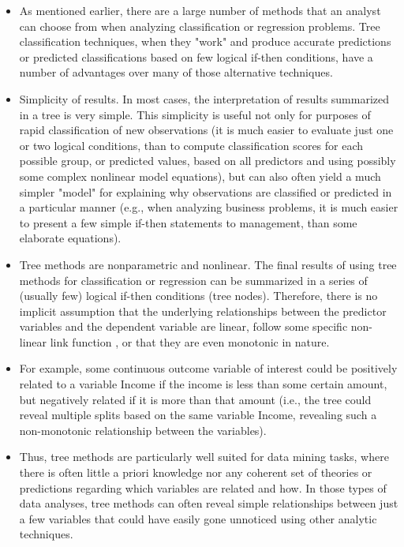 \documentclass[caret-main.tex]{subfiles}
\begin{document}
\begin{itemize}
\item As mentioned earlier, there are a large number of methods that an analyst can choose from when analyzing classification or regression problems. Tree classification techniques, when they "work" and produce accurate predictions or predicted classifications based on few logical if-then conditions, have a number of advantages over many of those alternative techniques.

\item Simplicity of results. In most cases, the interpretation of results summarized in a tree is very simple. This simplicity is useful not only for purposes of rapid classification of new observations (it is much easier to evaluate just one or two logical conditions, than to compute classification scores for each possible group, or predicted values, based on all predictors and using possibly some complex nonlinear model equations), but can also often yield a much simpler "model" for explaining why observations are classified or predicted in a particular manner (e.g., when analyzing business problems, it is much easier to present a few simple if-then statements to management, than some elaborate equations).

\item Tree methods are nonparametric and nonlinear. The final results of using tree methods for classification or regression can be summarized in a series of (usually few) logical if-then conditions (tree nodes). Therefore, there is no implicit assumption that the underlying relationships between the predictor variables and the dependent variable are linear, follow some specific non-linear link function , or that they are even monotonic in nature. 
\item For example, some continuous outcome variable of interest could be positively related to a variable Income if the income is less than some certain amount, but negatively related if it is more than that amount (i.e., the tree could reveal multiple splits based on the same variable Income, revealing such a non-monotonic relationship between the variables). 
\item Thus, tree methods are particularly well suited for data mining tasks, where there is often little a priori knowledge nor any coherent set of theories or predictions regarding which variables are related and how. In those types of data analyses, tree methods can often reveal simple relationships between just a few variables that could have easily gone unnoticed using other analytic techniques.
\end{itemize}
\end{document}
